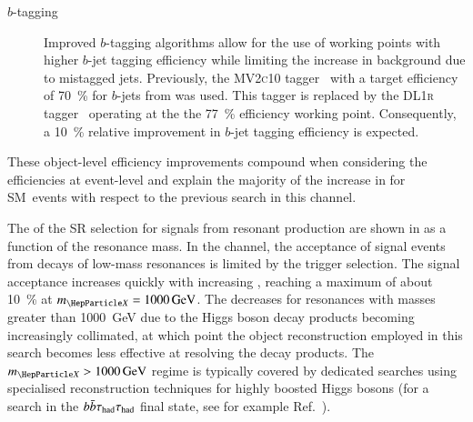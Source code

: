 \begin{description}
\item[$b$-tagging] Improved $b$-tagging algorithms allow for the use of working
  points with higher $b$-jet tagging efficiency while limiting the increase in
  background due to mistagged jets. Previously, the \textsc{MV2c10}
  tagger~\cite{ATL-PHYS-PUB-2016-012} with a target efficiency of
  \SI{70}{\percent} for $b$-jets from \ttbar was used. This tagger is replaced
  by the \textsc{DL1r} tagger~\cite{FTAG-2019-07} operating at the the
  \SI{77}{\percent} efficiency working point. Consequently, a \SI{10}{\percent}
  relative improvement in $b$-jet tagging efficiency is expected.


\end{description}
These object-level efficiency improvements compound when considering the
efficiencies at event-level
and explain the majority of the increase in \AccTimesEff for SM~\HH events with
respect to the previous search in this channel.

The \AccTimesEff of the SR selection for signals from resonant \HH production
are shown in  as a function of the
resonance mass. In the \hadhad channel, the acceptance of signal events from
decays of low-mass resonances is limited by the trigger selection. The signal
acceptance increases quickly with increasing \mX, reaching a maximum of about
\SI{10}{\percent} at $\mX = \SI{1000}{\GeV}$. The \AccTimesEff decreases for
resonances with masses greater than \SI{1000}{\GeV} due to the Higgs boson decay
products becoming increasingly collimated, at which point the object
reconstruction employed in this search becomes less effective at resolving the
decay products. The $\mX > \SI{1000}{\GeV}$ regime is typically covered by
dedicated searches using specialised reconstruction techniques for highly
boosted Higgs bosons (for a search in the $b\bar{b}\tau_{\text{had}}\tau_{\text{had}}$ final state, see for
example Ref.~\cite{HDBS-2019-22}).

